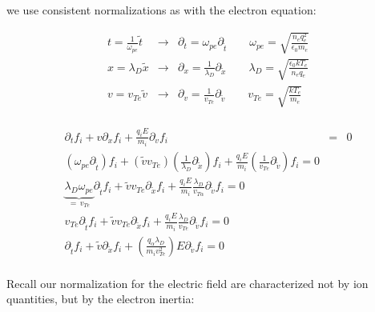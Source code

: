 we use consistent normalizations as with the electron equation:

\begin{eqnarray*}
t = \frac{1}{\omega_{pe}}\tilde{t} & \longrightarrow & \partial_t = \omega_{pe}\partial_{\tilde{t}} \qquad \omega_{pe} = \sqrt{\frac{n_{e} q_{e}^2}{\epsilon_0m_{e}}} \\
x = \lambda_D \tilde{x} & \longrightarrow & \partial_x = \frac{1}{\lambda_D}\partial_{\tilde{x}} \qquad \lambda_D = \sqrt{\frac{\epsilon_0 kT_{e}}{n_{e}q_{e}}} \\
v = v_{Te} \tilde{v} & \longrightarrow & \partial_v = \frac{1}{v_{Te}}\partial_{\tilde{v}} \qquad v_{Te} = \sqrt{\frac{kT_{e}}{m_{e}}}\\
\end{eqnarray*}

\begin{eqnarray*}
\partial_t f_{i} + v\partial_x f_{i} + \frac{q_{i}E}{m_{i}} \partial_v f_{i} & = & 0 \\
\left(\omega_{pe}\partial_{\tilde{t}}\right) f_{i} + \left(\tilde{v}v_{Te}\right) \left(\frac{1}{\lambda_D}\partial_{\tilde{x}}\right)f_{i} + \frac{q_{i}E}{m_{i}}\left(\frac{1}{v_{Te}}\partial_{\tilde{v}}\right) f_i = 0 \\
\underbrace{\lambda_D\omega_{pe}}_{=\, v_{Te}}\partial_{\tilde{t}} f_i + \tilde{v}v_{Te}\partial_{\tilde{x}}f_i + \frac{q_{i}E}{m_{i}}\frac{\lambda_D}{v_{T\alpha}}\partial_{\tilde{v}} f_i = 0 \\
v_{Te}\partial_{\tilde{t}} f_i + \tilde{v}v_{Te}\partial_{\tilde{x}}f_i + \frac{q_{i}E}{m_{i}}\frac{\lambda_D}{v_{Te}}\partial_{\tilde{v}} f_i = 0 \\
\partial_{\tilde{t}} f_i + \tilde{v}\partial_{\tilde{x}}f_i + \left(\frac{q_{\alpha}\lambda_D}{m_{i}v_{Te}^2}\right) E \partial_{\tilde{v}} f_i = 0 \\
\end{eqnarray*}

Recall our normalization for the electric field are characterized not by ion quantities, but by the electron inertia:































